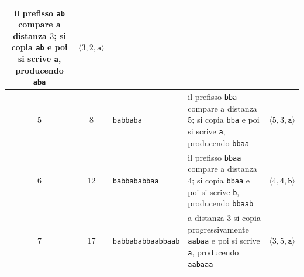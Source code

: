 \documentclass{article}
\theoremstyle{definition}
\numberwithin{equation}{section}
\begin{document}
\begin{center}
\begin{tabular}{|c|c|p{}|p{}|p{}|}
        il prefisso \texttt{ab} compare a distanza $3$; si copia \texttt{ab} e poi si scrive \texttt{a}, producendo \texttt{aba}       &
        $\langle 3,2,\texttt{a}\rangle$                                                                                                                                                                                                                \\ \hline
        5                                                                                                                              & 8            & \texttt{babbaba}                              &
        il prefisso \texttt{bba} compare a distanza $5$; si copia \texttt{bba} e poi si scrive \texttt{a}, producendo \texttt{bbaa}    &
        $\langle 5,3,\texttt{a}\rangle$                                                                                                                                                                                                                \\ \hline
        6                                                                                                                              & 12           & \texttt{babbababbaa}                          &
        il prefisso \texttt{bbaa} compare a distanza $4$; si copia \texttt{bbaa} e poi si scrive \texttt{b}, producendo \texttt{bbaab} &
        $\langle 4,4,\texttt{b}\rangle$                                                                                                                                                                                                                \\ \hline
        7                                                                                                                              & 17           & \texttt{babbabab}\allowbreak\texttt{baabbaab} &
        a distanza $3$ si copia progressivamente \texttt{aabaa} e poi si scrive \texttt{a}, producendo \texttt{aabaaa}                 &
        $\langle 3,5,\texttt{a}\rangle$                                                                                                                                                                                                                \\ \hline
    \end{tabular}
\end{center}
\end{document}
